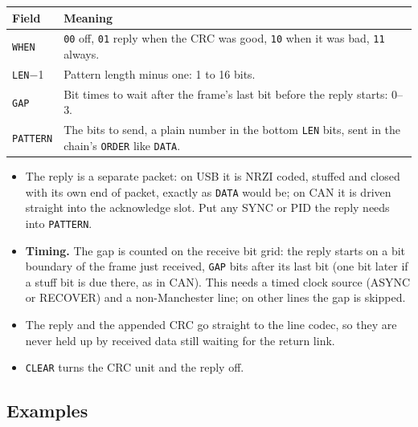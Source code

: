\documentclass[11pt,a4paper]{article}
\newcommand{\sig}[1]{\texttt{#1}}
\begin{document}
\begin{tabularx}{\linewidth}{@{}l>{\raggedright\arraybackslash}X@{}}
\toprule
Field & Meaning \\
\midrule
\sig{WHEN} & \texttt{00} off, \texttt{01} reply when the CRC was good, \texttt{10} when it was bad, \texttt{11} always. \\
\sig{LEN}$-$1 & Pattern length minus one: 1 to 16 bits. \\
\sig{GAP} & Bit times to wait after the frame's last bit before the reply starts: 0--3. \\
\sig{PATTERN} & The bits to send, a plain number in the bottom \sig{LEN} bits, sent in the chain's \sig{ORDER} like \sig{DATA}. \\
\bottomrule
\end{tabularx}

\begin{itemize}
\item The reply is a separate packet: on USB it is NRZI coded, stuffed and closed with its own end of packet, exactly as \sig{DATA} would be; on CAN it is driven straight into the acknowledge slot. Put any SYNC or PID the reply needs into \sig{PATTERN}.
\item \textbf{Timing.} The gap is counted on the receive bit grid: the reply starts on a bit boundary of the frame just received, \sig{GAP} bits after its last bit (one bit later if a stuff bit is due there, as in CAN). This needs a timed clock source (ASYNC or RECOVER) and a non-Manchester line; on other lines the gap is skipped.
\item The reply and the appended CRC go straight to the line codec, so they are never held up by received data still waiting for the return link.
\item \sig{CLEAR} turns the CRC unit and the reply off.
\end{itemize}

\subsection{Examples}
\end{document}
